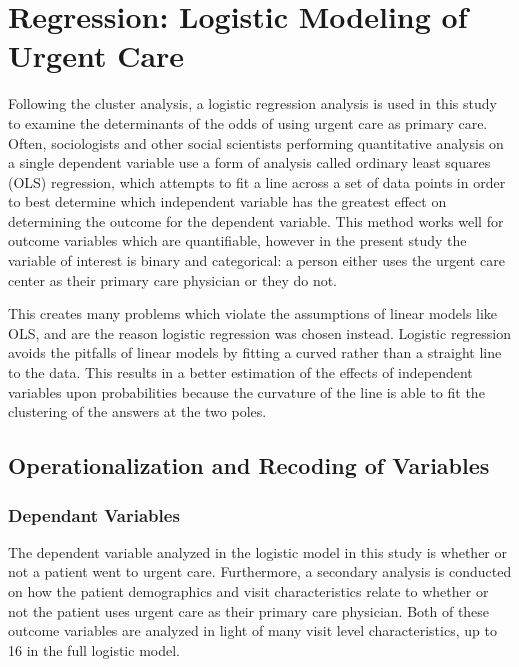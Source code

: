 \documentclass[12pt,twoside]{reedthesis}
\begin{document}
  \section*{Regression: Logistic Modeling of Urgent
  Care}\label{regression-logistic-modeling-of-urgent-care}
  
  Following the cluster analysis, a logistic regression analysis is used
  in this study to examine the determinants of the odds of using urgent
  care as primary care. Often, sociologists and other social scientists
  performing quantitative analysis on a single dependent variable use a
  form of analysis called ordinary least squares (OLS) regression, which
  attempts to fit a line across a set of data points in order to best
  determine which independent variable has the greatest effect on
  determining the outcome for the dependent variable. This method works
  well for outcome variables which are quantifiable, however in the
  present study the variable of interest is binary and categorical: a
  person either uses the urgent care center as their primary care
  physician or they do not.
  
  This creates many problems which violate the assumptions of linear
  models like OLS, and are the reason logistic regression was chosen
  instead. Logistic regression avoids the pitfalls of linear models by
  fitting a curved rather than a straight line to the data. This results
  in a better estimation of the effects of independent variables upon
  probabilities because the curvature of the line is able to fit the
  clustering of the answers at the two poles.
  
  \subsection*{Operationalization and Recoding of
  Variables}\label{operationalization-and-recoding-of-variables}
  
  \subsubsection*{Dependant Variables}\label{dependant-variables}
  
  The dependent variable analyzed in the logistic model in this study is
  whether or not a patient went to urgent care. Furthermore, a secondary
  analysis is conducted on how the patient demographics and visit
  characteristics relate to whether or not the patient uses urgent care as
  their primary care physician. Both of these outcome variables are
  analyzed in light of many visit level characteristics, up to 16 in the
  full logistic model.
  
\end{document}
